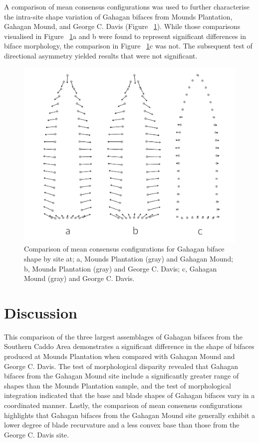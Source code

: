\documentclass[review]{elsarticle}
\begin{document}
A comparison of mean consensus configurations was used to further characterise the intra-site shape variation of Gahagan bifaces from Mounds Plantation, Gahagan Mound, and George C. Davis (Figure ~\ref{fig:FigMeanShp}). While those comparisons visualised in Figure ~\ref{fig:FigMeanShp}a and b were found to represent significant differences in biface morphology, the comparison in Figure ~\ref{fig:FigMeanShp}c was not. The subsequent test of directional asymmetry yielded results that were not significant.

\begin{figure}[ht]\centering
\includegraphics[width=\linewidth]{ref-to-target}
\caption{Comparison of mean consensus configurations for Gahagan biface shape by site at; a, Mounds Plantation (gray) and Gahagan Mound; b, Mounds Plantation (gray) and George C. Davis; c, Gahagan Mound (gray) and George C. Davis.}
\label{fig:FigMeanShp}
\end{figure}

\section{Discussion}

This comparison of the three largest assemblages of Gahagan bifaces from the Southern Caddo Area demonstrates a significant difference in the shape of bifaces produced at Mounds Plantation when compared with Gahagan Mound and George C. Davis. The test of morphological disparity revealed that Gahagan bifaces from the Gahagan Mound site include a significantly greater range of shapes than the Mounds Plantation sample, and the test of morphological integration indicated that the base and blade shapes of Gahagan bifaces vary in a coordinated manner. Lastly, the comparison of mean consensus configurations highlights that Gahagan bifaces from the Gahagan Mound site generally exhibit a lower degree of blade recurvature and a less convex base than those from the George C. Davis site.
\end{document}
